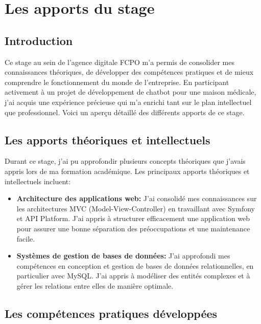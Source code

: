 \chapter{Les apports du stage}
\label{chap:Chapter 5 title} 
\section*{Introduction}

Ce stage au sein de l’agence digitale FCPO m’a permis de consolider mes connaissances théoriques, de développer des compétences pratiques et de mieux comprendre le fonctionnement du monde de l’entreprise. En participant activement à un projet de développement de chatbot pour une maison médicale, j’ai acquis une expérience précieuse qui m’a enrichi tant sur le plan intellectuel que professionnel. Voici un aperçu détaillé des différents apports de ce stage.

\pagebreak

\section{Les apports théoriques et intellectuels}

\hspace{16pt} Durant ce stage, j’ai pu approfondir plusieurs concepts théoriques que j'avais appris lors de ma formation académique. Les principaux apports théoriques et intellectuels incluent:

\begin{itemize}
  \item \textbf{Architecture des applications web: }J’ai consolidé mes connaissances sur les architectures MVC (Model-View-Controller) en travaillant avec Symfony et API Platform. J’ai appris à structurer efficacement une application web pour assurer une bonne séparation des préoccupations et une maintenance facile.
  \item \textbf{Systèmes de gestion de bases de données: }J’ai approfondi mes compétences en conception et gestion de bases de données relationnelles, en particulier avec MySQL. J’ai appris à modéliser des entités complexes et à gérer les relations entre elles de manière optimale.
\end{itemize}

\section{Les compétences pratiques développées}

